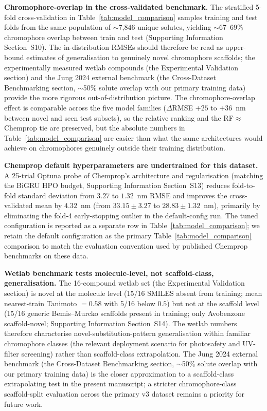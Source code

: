 \documentclass[journal=jcisd8,manuscript=article]{achemso}
\newcommand{\added}[1]{{\color{addedblue}#1}}
\begin{document}
\added{\textbf{Chromophore-overlap in the cross-validated benchmark.} The stratified 5-fold cross-validation in Table~\ref{tab:model_comparison} samples training and test folds from the same population of $\sim$7{,}846 unique solutes, yielding $\sim$67--69\% chromophore overlap between train and test (Supporting Information Section~S10). The in-distribution RMSEs should therefore be read as upper-bound estimates of generalisation to genuinely novel chromophore scaffolds; the experimentally measured wetlab compounds (the Experimental Validation section) and the Jung 2024 external benchmark (the Cross-Dataset Benchmarking section, $\sim$50\% solute overlap with our primary training data) provide the more rigorous out-of-distribution picture. The chromophore-overlap effect is comparable across the five model families ($\Delta$RMSE $+25$ to $+36$~nm between novel and seen test subsets), so the relative ranking and the RF$\approx$Chemprop tie are preserved, but the absolute numbers in Table~\ref{tab:model_comparison} are easier than what the same architectures would achieve on chromophores genuinely outside their training distribution.}

\added{\textbf{Chemprop default hyperparameters are undertrained for this dataset.} A 25-trial Optuna probe of Chemprop's architecture and regularisation (matching the BiGRU HPO budget, Supporting Information Section~S13) reduces fold-to-fold standard deviation from $3.27$ to $1.32$~nm RMSE and improves the cross-validated mean by $4.32$~nm (from $33.15 \pm 3.27$ to $28.83 \pm 1.32$~nm), primarily by eliminating the fold-4 early-stopping outlier in the default-config run. The tuned configuration is reported as a separate row in Table~\ref{tab:model_comparison}; we retain the default configuration as the primary Table~\ref{tab:model_comparison} comparison to match the evaluation convention used by published Chemprop benchmarks on these data.}

\added{\textbf{Wetlab benchmark tests molecule-level, not scaffold-class, generalisation.} The 16-compound wetlab set (the Experimental Validation section) is novel at the molecule level (15/16 SMILES absent from training; mean nearest-train Tanimoto $= 0.58$ with 5/16 below $0.5$) but not at the scaffold level (15/16 generic Bemis--Murcko scaffolds present in training; only Avobenzone scaffold-novel; Supporting Information Section~S14). The wetlab numbers therefore characterise novel-substitution-pattern generalisation within familiar chromophore classes (the relevant deployment scenario for photosafety and UV-filter screening) rather than scaffold-class extrapolation. The Jung 2024 external benchmark (the Cross-Dataset Benchmarking section, $\sim$50\% solute overlap with our primary training data) is the closer approximation to a scaffold-class extrapolating test in the present manuscript; a stricter chromophore-class scaffold-split evaluation across the primary v3 dataset remains a priority for future work.}
\end{document}
